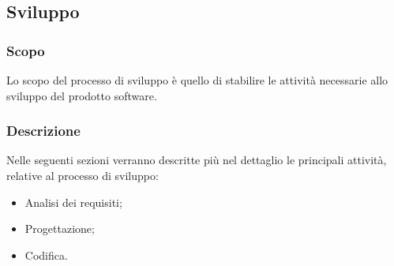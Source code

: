 \subsection{Sviluppo}

\subsubsection{Scopo}
Lo scopo del processo di sviluppo è quello di stabilire le attività necessarie allo sviluppo del prodotto software.

\subsubsection{Descrizione}
Nelle seguenti sezioni verranno descritte più nel dettaglio le principali attività, relative al processo di sviluppo:
\begin{itemize} 
    \item Analisi dei requisiti;
	\item Progettazione;
	\item Codifica.
\end{itemize}



